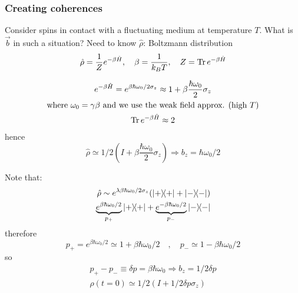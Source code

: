 \documentclass[12pt]{article}
\newcommand{\be}{\begin{equation}}
\newcommand{\ee}{\end{equation}}
\begin{document}
\subsubsection{Creating coherences}

Consider spins in contact with a fluctuating medium
at temperature \(T\). What is \(\vec{b}\) in such a situation? Need
to know \(\hat{\rho}\): Boltzmann distribution
\be
\hat{\rho}=\frac{1}{Z} e^{-\beta \hat{H}}, \quad
\beta=\frac{1}{k_{B} T}, \quad 
Z=\Tr e^{-\beta \hat{H}}
\ee

\be
\begin{gathered}
e^{-\beta \hat{H}}=e^{\beta \hbar \omega_{0} / 2 \sigma_{z}} \approx 1+\beta \frac{\hbar \omega_{0}}{2} \sigma_{z}\\
\text{where } \omega_0 = \gamma\beta \text{ and we use the weak field approx. (high $T$)}\\
\Tr e^{-\beta \hat{H}} \approx 2
\end{gathered}
\ee
hence
\be
\hat{\rho} \simeq 1 / 2\left(I+\beta \frac{\hbar \omega_{0}}{2} \sigma_{z}\right) \Rightarrow b_{z}=\hbar \omega_{0} / 2
\ee

Note that:
\[
\begin{aligned}
\hat{\rho} \sim e^{\lambda \beta \hbar \omega_{0} / 2 \sigma_z} (\op{+} + \op{-})\\
\underbrace{e^{ \beta \hbar \omega_{0} / 2}}_{p_+} \op{+} + 
\underbrace{e^{-\beta \hbar \omega_{0} / 2}}_{p_-} \op{-}
\end{aligned}
\]
therefore
\be
p_{+}=e^{\beta \hbar \omega_{0} / 2} \simeq 1+\beta \hbar \omega_{0} / 2 \quad, \quad 
p_{-} \simeq 1-\beta \hbar \omega_{0} / 2
\ee
so
\be
\begin{gathered}
p_+ - p_- \equiv \delta p = \beta \hbar \omega_{0} \Rightarrow b_z = 1/2 \delta p\\
\rho(t=0) \simeq 1/2 (I + 1/2 \delta p \sigma_z)
\end{gathered}
\ee
\end{document}
